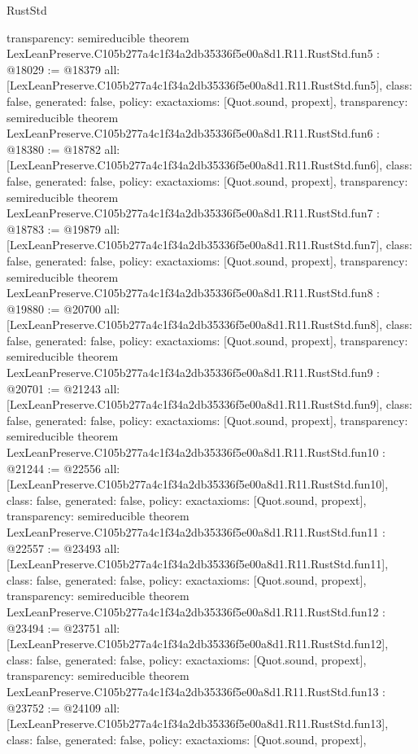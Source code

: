 \begin{lexlean}{RustStd}
\begin{coremodule}
{  transparency: semireducible
}
theorem LexLeanPreserve.C105b277a4c1f34a2db35336f5e00a8d1.R11.RustStd.fun5 : @18029 := @18379 {
  all: [LexLeanPreserve.C105b277a4c1f34a2db35336f5e00a8d1.R11.RustStd.fun5],
  class: false,
  generated: false,
  policy: exact{axioms: [Quot.sound, propext]},
  transparency: semireducible
}
theorem LexLeanPreserve.C105b277a4c1f34a2db35336f5e00a8d1.R11.RustStd.fun6 : @18380 := @18782 {
  all: [LexLeanPreserve.C105b277a4c1f34a2db35336f5e00a8d1.R11.RustStd.fun6],
  class: false,
  generated: false,
  policy: exact{axioms: [Quot.sound, propext]},
  transparency: semireducible
}
theorem LexLeanPreserve.C105b277a4c1f34a2db35336f5e00a8d1.R11.RustStd.fun7 : @18783 := @19879 {
  all: [LexLeanPreserve.C105b277a4c1f34a2db35336f5e00a8d1.R11.RustStd.fun7],
  class: false,
  generated: false,
  policy: exact{axioms: [Quot.sound, propext]},
  transparency: semireducible
}
theorem LexLeanPreserve.C105b277a4c1f34a2db35336f5e00a8d1.R11.RustStd.fun8 : @19880 := @20700 {
  all: [LexLeanPreserve.C105b277a4c1f34a2db35336f5e00a8d1.R11.RustStd.fun8],
  class: false,
  generated: false,
  policy: exact{axioms: [Quot.sound, propext]},
  transparency: semireducible
}
theorem LexLeanPreserve.C105b277a4c1f34a2db35336f5e00a8d1.R11.RustStd.fun9 : @20701 := @21243 {
  all: [LexLeanPreserve.C105b277a4c1f34a2db35336f5e00a8d1.R11.RustStd.fun9],
  class: false,
  generated: false,
  policy: exact{axioms: [Quot.sound, propext]},
  transparency: semireducible
}
theorem LexLeanPreserve.C105b277a4c1f34a2db35336f5e00a8d1.R11.RustStd.fun10 : @21244 := @22556 {
  all: [LexLeanPreserve.C105b277a4c1f34a2db35336f5e00a8d1.R11.RustStd.fun10],
  class: false,
  generated: false,
  policy: exact{axioms: [Quot.sound, propext]},
  transparency: semireducible
}
theorem LexLeanPreserve.C105b277a4c1f34a2db35336f5e00a8d1.R11.RustStd.fun11 : @22557 := @23493 {
  all: [LexLeanPreserve.C105b277a4c1f34a2db35336f5e00a8d1.R11.RustStd.fun11],
  class: false,
  generated: false,
  policy: exact{axioms: [Quot.sound, propext]},
  transparency: semireducible
}
theorem LexLeanPreserve.C105b277a4c1f34a2db35336f5e00a8d1.R11.RustStd.fun12 : @23494 := @23751 {
  all: [LexLeanPreserve.C105b277a4c1f34a2db35336f5e00a8d1.R11.RustStd.fun12],
  class: false,
  generated: false,
  policy: exact{axioms: [Quot.sound, propext]},
  transparency: semireducible
}
theorem LexLeanPreserve.C105b277a4c1f34a2db35336f5e00a8d1.R11.RustStd.fun13 : @23752 := @24109 {
  all: [LexLeanPreserve.C105b277a4c1f34a2db35336f5e00a8d1.R11.RustStd.fun13],
  class: false,
  generated: false,
  policy: exact{axioms: [Quot.sound, propext]},
}
\end{coremodule}
\end{lexlean}
